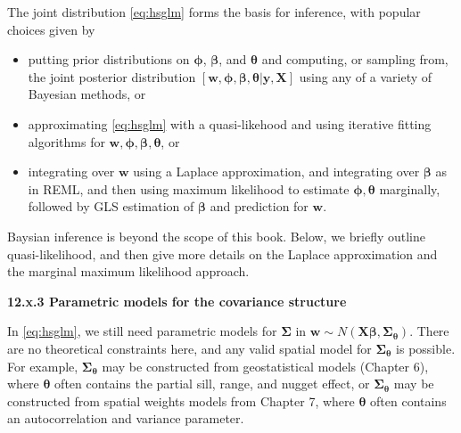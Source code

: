 \documentclass[12pt, titlepage]{article}
\begin{document}
The joint distribution \ref{eq:hsglm} forms the basis for inference, with popular choices given by
\begin{itemize}
\item putting prior distributions on $\boldsymbol{\phi}$, $\boldsymbol{\beta}$, and $\boldsymbol{\theta}$ and computing, or sampling from, the joint posterior distribution $[\mathbf{w},\boldsymbol{\phi},\boldsymbol{\beta},\boldsymbol{\theta}|\mathbf{y},\mathbf{X}]$ using any of a variety of Bayesian methods, or 
\item approximating \eqref{eq:hsglm} with a quasi-likehood and using iterative fitting algorithms for $\mathbf{w},\boldsymbol{\phi},\boldsymbol{\beta},\boldsymbol{\theta}$, or
\item integrating over $\mathbf{w}$ using a Laplace approximation, and integrating over $\boldsymbol{\beta}$ as in REML, and then using maximum likelihood to estimate $\boldsymbol{\phi},\boldsymbol{\theta}$ marginally, followed by GLS estimation of $\boldsymbol{\beta}$ and prediction for $\mathbf{w}$.
\end{itemize}

Baysian inference is beyond the scope of this book. Below, we briefly outline quasi-likelihood, and then give more details on the Laplace approximation and the marginal maximum likelihood approach.



{\large \flushleft \textbf{12.x.3 Parametric models for the covariance structure}}

In \eqref{eq:hsglm}, we still need parametric models for $\boldsymbol{\Sigma}$ in $\mathbf{w} \sim N(\mathbf{X}\boldsymbol{\beta},\boldsymbol{\Sigma}_{\boldsymbol{\theta}})$.  There are no theoretical constraints here, and any valid spatial model for $\boldsymbol{\Sigma}_{\boldsymbol{\theta}}$ is possible. For example, $\boldsymbol{\Sigma}_{\boldsymbol{\theta}}$ may be constructed from geostatistical models (Chapter 6), where $\boldsymbol{\theta}$ often contains the partial sill, range, and nugget effect, or $\boldsymbol{\Sigma}_{\boldsymbol{\theta}}$ may be constructed from spatial weights models from Chapter 7, where $\boldsymbol{\theta}$ often contains an autocorrelation and variance parameter.
\end{document}
